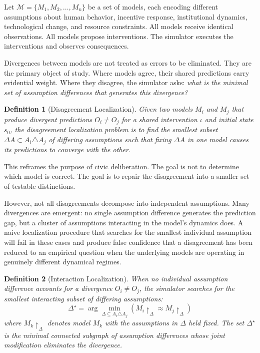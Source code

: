\documentclass[12pt]{article}
\newtheorem{definition}{Definition}
\begin{document}
Let $\mathcal{M} = \{M_1, M_2, \ldots, M_n\}$ be a set of models, each encoding different assumptions about human behavior, incentive response, institutional dynamics, technological change, and resource constraints. All models receive identical observations. All models propose interventions. The simulator executes the interventions and observes consequences.

Divergences between models are not treated as errors to be eliminated. They are the primary object of study. Where models agree, their shared predictions carry evidential weight. Where they disagree, the simulator asks: \emph{what is the minimal set of assumption differences that generates this divergence?}

\begin{definition}[Disagreement Localization]
Given two models $M_i$ and $M_j$ that produce divergent predictions $O_i \neq O_j$ for a shared intervention $\iota$ and initial state $s_0$, the \emph{disagreement localization problem} is to find the smallest subset $\Delta A \subset A_i \triangle A_j$ of differing assumptions such that fixing $\Delta A$ in one model causes its predictions to converge with the other.
\end{definition}

This reframes the purpose of civic deliberation. The goal is not to determine which model is correct. The goal is to repair the disagreement into a smaller set of testable distinctions.

However, not all disagreements decompose into independent assumptions. Many divergences are emergent: no single assumption difference generates the prediction gap, but a cluster of assumptions interacting in the model's dynamics does. A naive localization procedure that searches for the smallest individual assumption will fail in these cases and produce false confidence that a disagreement has been reduced to an empirical question when the underlying models are operating in genuinely different dynamical regimes.

\begin{definition}[Interaction Localization]
When no individual assumption difference accounts for a divergence $O_i \neq O_j$, the simulator searches for the smallest \emph{interacting subset} of differing assumptions:
\[
  \Delta^\star = \arg\min_{\Delta \subseteq A_i \triangle A_j} \left( M_i\!\restriction_\Delta \approx M_j\!\restriction_\Delta \right)
\]
where $M_k\!\restriction_\Delta$ denotes model $M_k$ with the assumptions in $\Delta$ held fixed. The set $\Delta^\star$ is the minimal connected subgraph of assumption differences whose joint modification eliminates the divergence.
\end{definition}
\end{document}
